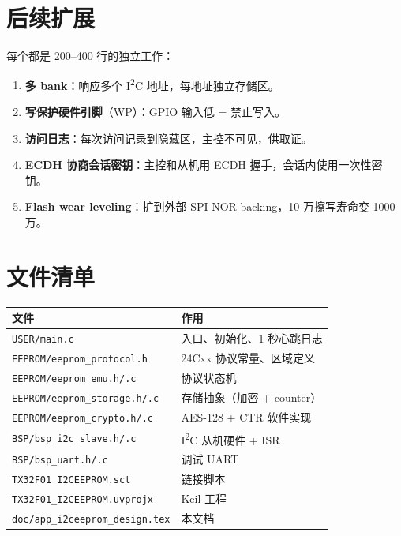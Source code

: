 \documentclass[UTF8,a4paper,11pt]{ctexart}
\begin{document}
\section{后续扩展}

每个都是 200--400 行的独立工作：

\begin{enumerate}
    \item \textbf{多 bank}：响应多个 I\textsuperscript{2}C 地址，每地址独立存储区。
    \item \textbf{写保护硬件引脚}（WP）：GPIO 输入低 = 禁止写入。
    \item \textbf{访问日志}：每次访问记录到隐藏区，主控不可见，供取证。
    \item \textbf{ECDH 协商会话密钥}：主控和从机用 ECDH 握手，会话内使用一次性密钥。
    \item \textbf{Flash wear leveling}：扩到外部 SPI NOR backing，10 万擦写寿命变 1000 万。
\end{enumerate}

\section{文件清单}

\begin{center}
\begin{longtable}{ll}
\toprule
\textbf{文件} & \textbf{作用} \\
\midrule
\endhead
\texttt{USER/main.c}                & 入口、初始化、1 秒心跳日志 \\
\texttt{EEPROM/eeprom\_protocol.h}  & 24Cxx 协议常量、区域定义 \\
\texttt{EEPROM/eeprom\_emu.h/.c}    & 协议状态机 \\
\texttt{EEPROM/eeprom\_storage.h/.c} & 存储抽象（加密 + counter） \\
\texttt{EEPROM/eeprom\_crypto.h/.c} & AES-128 + CTR 软件实现 \\
\texttt{BSP/bsp\_i2c\_slave.h/.c}   & I\textsuperscript{2}C 从机硬件 + ISR \\
\texttt{BSP/bsp\_uart.h/.c}         & 调试 UART \\
\texttt{TX32F01\_I2CEEPROM.sct}     & 链接脚本 \\
\texttt{TX32F01\_I2CEEPROM.uvprojx} & Keil 工程 \\
\texttt{doc/app\_i2ceeprom\_design.tex} & 本文档 \\
\bottomrule
\end{longtable}
\end{center}
\end{document}
